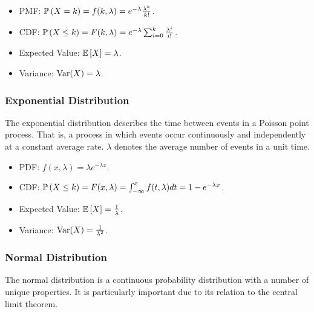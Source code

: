 \documentclass[12pt, titlepage]{article}
\begin{document}
\begin{info}{}
	\begin{itemize}
		\item PMF: $\mathbb{P}\left(X = k\right) = f(k, \lambda) = e^{-\lambda} \frac{\lambda^k}{k!}$.
		\item CDF: $\mathbb{P}\left(X \leq k\right) = F(k, \lambda) = e^{-\lambda} \sum_{i=0}^k \frac{\lambda^i}{i!}$.
		\item Expected Value: $\mathbb{E}\left[X\right] = \lambda$.
		\item Variance: $\operatorname{Var}(X) = \lambda$.
	\end{itemize}
\end{info}

\subsubsection{Exponential Distribution}

\begin{rmk}
	The exponential distribution describes the time between events in a Poisson point process. That is, a process in which events occur continuously and independently at a constant average rate. $\lambda$ denotes the average number of events in a unit time.
\end{rmk}

\begin{info}{}
	\begin{itemize}
		\item PDF: $f(x, \lambda) = \lambda e^{-\lambda x}$.
		\item CDF: $\mathbb{P}\left(X \leq k\right) = F(x, \lambda) = \int_{-\infty}^x f(t, \lambda) dt = 1 - e^{-\lambda x}$.
		\item Expected Value: $\mathbb{E}\left[X\right] = \frac{1}{\lambda}$.
		\item Variance: $\operatorname{Var}(X) = \frac{1}{\lambda^2}$.
	\end{itemize}
\end{info}

\subsubsection{Normal Distribution}

\begin{rmk}
	The normal distribution is a continuous probability distribution with a number of unique properties. It is particularly important due to its relation to the central limit theorem.
\end{rmk}
\end{document}

